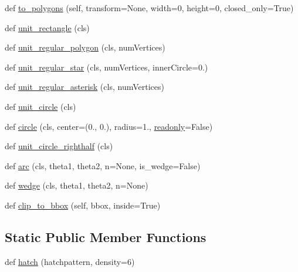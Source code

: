 \begin{DoxyCompactItemize}
\item 
def \hyperlink{classmatplotlib_1_1path_1_1Path_a8bc3f213058dc56411ad019efbe74acb}{to\+\_\+polygons} (self, transform=None, width=0, height=0, closed\+\_\+only=True)
\item 
def \hyperlink{classmatplotlib_1_1path_1_1Path_a57ee8ff0d3ce3c4fd418b88185881bcd}{unit\+\_\+rectangle} (cls)
\item 
def \hyperlink{classmatplotlib_1_1path_1_1Path_a922129b6b590f2a951baa32c1615f110}{unit\+\_\+regular\+\_\+polygon} (cls, num\+Vertices)
\item 
def \hyperlink{classmatplotlib_1_1path_1_1Path_ae2b4fc8eeb290b8708e80a7a0c159f26}{unit\+\_\+regular\+\_\+star} (cls, num\+Vertices, inner\+Circle=0.)
\item 
def \hyperlink{classmatplotlib_1_1path_1_1Path_a34d0d3657f364ed9e06190c8a0efea7a}{unit\+\_\+regular\+\_\+asterisk} (cls, num\+Vertices)
\item 
def \hyperlink{classmatplotlib_1_1path_1_1Path_a8e59114bca03a98af3c350a61eb0e6fc}{unit\+\_\+circle} (cls)
\item 
def \hyperlink{classmatplotlib_1_1path_1_1Path_a2e8e8b67f94962b815605930f7a79789}{circle} (cls, center=(0., 0.), radius=1., \hyperlink{classmatplotlib_1_1path_1_1Path_aaed6949dcf8a429992d3056abf8e2bc8}{readonly}=False)
\item 
def \hyperlink{classmatplotlib_1_1path_1_1Path_a54b3bec2a795959ce6ddeeb5d30a6db3}{unit\+\_\+circle\+\_\+righthalf} (cls)
\item 
def \hyperlink{classmatplotlib_1_1path_1_1Path_a831c0ae14915703ed6f7a45d761dbf71}{arc} (cls, theta1, theta2, n=None, is\+\_\+wedge=False)
\item 
def \hyperlink{classmatplotlib_1_1path_1_1Path_ae2412176d4ed34f94addd95f00ffa696}{wedge} (cls, theta1, theta2, n=None)
\item 
def \hyperlink{classmatplotlib_1_1path_1_1Path_a9cadda4af3011a672a4c2bde5f396446}{clip\+\_\+to\+\_\+bbox} (self, bbox, inside=True)
\end{DoxyCompactItemize}
\subsection*{Static Public Member Functions}
\begin{DoxyCompactItemize}
\item 
def \hyperlink{classmatplotlib_1_1path_1_1Path_a974fa9fa2569e5e79ef9bc3adf3a2e4a}{hatch} (hatchpattern, density=6)
\end{DoxyCompactItemize}
